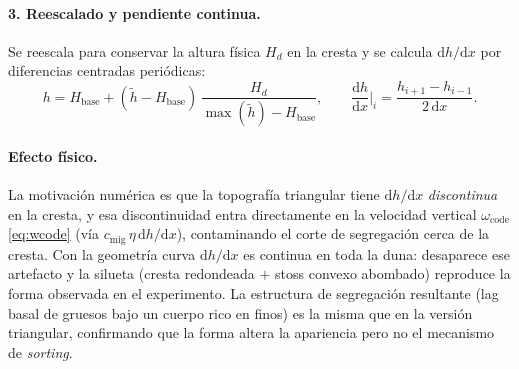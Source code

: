 \documentclass[11pt,a4paper]{article}
\newcommand{\dd}{\mathrm{d}}
\begin{document}
\paragraph{3. Reescalado y pendiente continua.} Se reescala para conservar
la altura física $H_d$ en la cresta y se calcula $\dd h/\dd x$ por
diferencias centradas periódicas:
\begin{equation}
    h = H_{\mathrm{base}} + (\tilde h - H_{\mathrm{base}})\,\frac{H_d}{\max(\tilde h)-H_{\mathrm{base}}},
    \qquad
    \frac{\dd h}{\dd x}\Big|_i = \frac{h_{i+1}-h_{i-1}}{2\,\dd x}.
\end{equation}

\paragraph{Efecto físico.} La motivación numérica es que la topografía
triangular tiene $\dd h/\dd x$ \emph{discontinua} en la cresta, y esa
discontinuidad entra directamente en la velocidad vertical
$\omega_{\mathrm{code}}$ \eqref{eq:wcode} (vía $c_{\mathrm{mig}}\,\eta\,
\dd h/\dd x$), contaminando el corte de segregación cerca de la cresta. Con
la geometría curva $\dd h/\dd x$ es continua en toda la duna: desaparece
ese artefacto y la silueta (cresta redondeada $+$ stoss convexo abombado)
reproduce la forma observada en el experimento. La estructura de
segregación resultante (lag basal de gruesos bajo un cuerpo rico en finos)
es la misma que en la versión triangular, confirmando que la forma altera
la apariencia pero no el mecanismo de \emph{sorting}.
\end{document}
